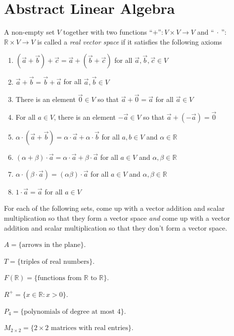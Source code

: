 \documentclass[14pt]{problemset}
\newcommand{\R}{\mathbb{R}}
\begin{document}
	\newpage
	\section*{Abstract Linear Algebra}
	\setcounter{question}{0}
	\begin{definition}
		A non-empty set $V$ together with two functions ``$+$''$:V\times V\to V$
		and ``$\ \cdot\ $'':$\R\times V\to V$ is called a \emph{real vector space}
		if it satisfies the following axioms 
		\begin{enumerate}
			\item $(\vec a+\vec b)+\vec c=\vec a+(\vec b+\vec c)$ for all $\vec a,\vec b,\vec c\in V$
			\item $\vec a+\vec b=\vec b+\vec a$ for all $\vec a,\vec b\in V$
			\item There is an element $\vec 0\in V$ so that $\vec a+\vec 0=\vec a$ for all $\vec a\in V$
			\item For all $a\in V$, there is an element $-\vec a\in V$ so that $\vec a+(-\vec a)=\vec 0$
			\item $\alpha\cdot (\vec a+\vec b)=\alpha\cdot \vec a+\alpha\cdot \vec b$ for all $a,b\in V$ and $\alpha\in \R$
			\item $(\alpha+\beta)\cdot\vec a = \alpha\cdot \vec a+\beta\cdot \vec a$ for all $a\in V$ and $\alpha,\beta\in \R$
			\item $\alpha\cdot (\beta \cdot \vec a) = (\alpha\beta)\cdot \vec a$ for all $a\in V$ and $\alpha,\beta \in \R$
			\item $1\cdot \vec a=\vec a$ for all $a\in V$
		\end{enumerate}
	\end{definition}

	\question
	For each of the following sets, come up with a vector addition and scalar multiplication
	so that they form a vector space \emph{and} come up with a vector addition and scalar
	multiplication so that they don't form a vector space.
	\begin{parts}
		\item $A=\{\text{arrows in the plane}\}$.
		\item $T=\{\text{triples of real numbers}\}$.
		\item $F(\R)=\{\text{functions from $\R$ to $\R$}\}$.
		\item $R^+ = \{x\in\R:x>0\}$.
		\item $P_4=\{\text{polynomials of degree at most $4$}\}$.
		\item $M_{2\times 2}=\{2\times 2\text{ matrices with real entries}\}$.
	\end{parts}
\end{document}
